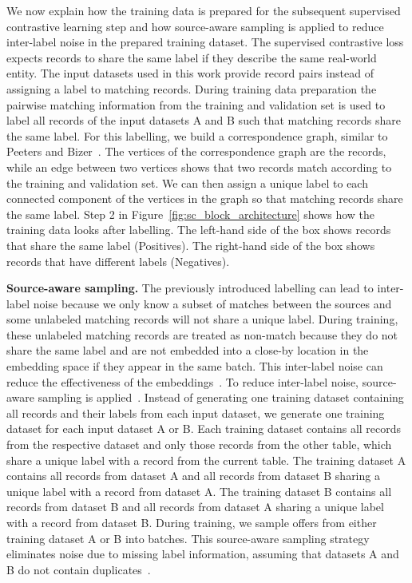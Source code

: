 \documentclass[sigconf,nonacm]{acmart}
\begin{document}
We now explain how the training data is prepared for the subsequent supervised contrastive learning step and how source-aware sampling is applied to reduce inter-label noise in the prepared training dataset.
The supervised contrastive loss expects records to share the same label if they describe the same real-world entity.
The input datasets used in this work provide record pairs instead of assigning a label to matching records.
During training data preparation the pairwise matching information from the training and validation set is used to label all records of the input datasets A and B such that matching records share the same label.
For this labelling, we build a correspondence graph, similar to Peeters and Bizer~\cite{peeters_supervised_2022}. The vertices of the correspondence graph are the records, while an edge between two vertices shows that two records match according to the training and validation set. We can then assign a unique label to each connected component of the vertices in the graph so that matching records share the same label.
Step 2 in Figure~\ref{fig:sc_block_architecture} shows how the training data looks after labelling. The left-hand side of the box shows records that share the same label (Positives). The right-hand side of the box shows records that have different labels (Negatives).

\vspace{.1cm}\noindent\textbf{Source-aware sampling.}
The previously introduced labelling can lead to inter-label noise because we only know a subset of matches between the sources and some unlabeled matching records will not share a unique label.
During training, these unlabeled matching records are treated as non-match because they do not share the same label and are not embedded into a close-by location in the embedding space if they appear in the same batch. 
This inter-label noise can reduce the effectiveness of the embeddings~\cite{chuang_debiased_2020}.
To reduce inter-label noise, source-aware sampling is applied~\cite{peeters_supervised_2022}.
Instead of generating one training dataset containing all records and their labels from each input dataset, we generate one training dataset for each input dataset A or B.
Each training dataset contains all records from the respective dataset and only those records from the other table, which share a unique label with a record from the current table.
The training dataset A contains all records from dataset A and all records from dataset B sharing a unique label with a record from dataset A.
The training dataset B contains all records from dataset B and all records from dataset A sharing a unique label with a record from dataset B.
During training, we sample offers from either training dataset A or B into batches. This source-aware sampling strategy eliminates noise due to missing label information, assuming that datasets A and B do not contain duplicates~\cite{peeters_supervised_2022}.
\end{document}
